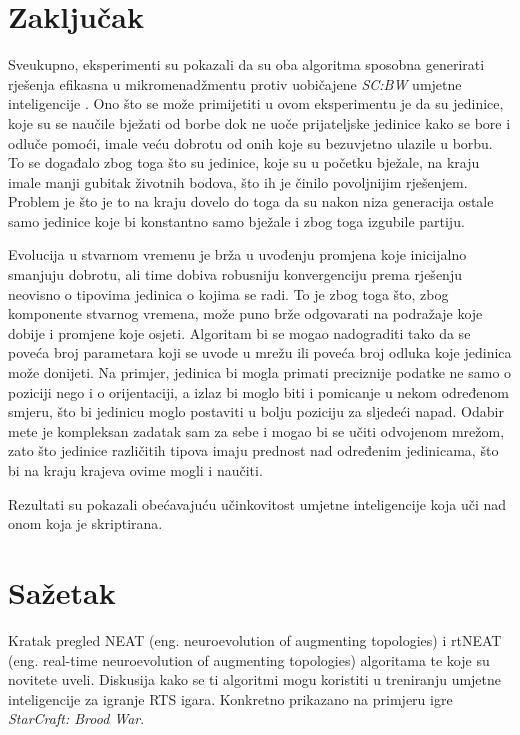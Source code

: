 \documentclass[times, utf8, seminar, numeric]{fer}
\begin{document}
\chapter{Zaključak}
Sveukupno, eksperimenti su pokazali da su oba algoritma sposobna generirati rješenja efikasna u mikromenadžmentu protiv uobičajene \textit{SC:BW} umjetne inteligencije \citep{rad5}. Ono što se može primijetiti u ovom eksperimentu je da su jedinice, koje su se naučile bježati od borbe dok ne uoče prijateljske jedinice kako se bore i odluče pomoći, imale veću dobrotu od onih koje su bezuvjetno ulazile u borbu. To se događalo zbog toga što su jedinice, koje su u početku bježale, na kraju imale manji gubitak životnih bodova, što ih je činilo povoljnijim rješenjem. Problem je što je to na kraju dovelo do toga da su nakon niza generacija ostale samo jedinice koje bi konstantno samo bježale i zbog toga izgubile partiju.

Evolucija u stvarnom vremenu je brža u uvođenju promjena koje inicijalno smanjuju dobrotu, ali time dobiva robusniju konvergenciju prema rješenju neovisno o tipovima jedinica o kojima se radi. To je zbog toga što, zbog komponente stvarnog vremena, može puno brže odgovarati na podražaje koje dobije i promjene koje osjeti. Algoritam bi se mogao nadograditi tako da se poveća broj parametara koji se uvode u mrežu ili poveća broj odluka koje jedinica može donijeti. Na primjer, jedinica bi mogla primati preciznije podatke ne samo o poziciji nego i o orijentaciji, a izlaz bi moglo biti i pomicanje u nekom određenom smjeru, što bi jedinicu moglo postaviti u bolju poziciju za sljedeći napad. Odabir mete je kompleksan zadatak sam za sebe i mogao bi se učiti odvojenom mrežom, zato što jedinice različitih tipova imaju prednost nad određenim jedinicama, što bi na kraju krajeva ovime mogli i naučiti.

Rezultati \citep{rad5} su pokazali obećavajuću učinkovitost umjetne inteligencije koja uči nad onom koja je skriptirana.




\chapter{Sažetak}
Kratak pregled NEAT (eng. neuroevolution of augmenting topologies) i rtNEAT (eng. real-time neuroevolution of augmenting topologies) algoritama te koje su novitete uveli. Diskusija kako se ti algoritmi mogu koristiti u treniranju umjetne inteligencije za igranje RTS igara. Konkretno prikazano na primjeru igre \textit{StarCraft: Brood War}.
\end{document}
